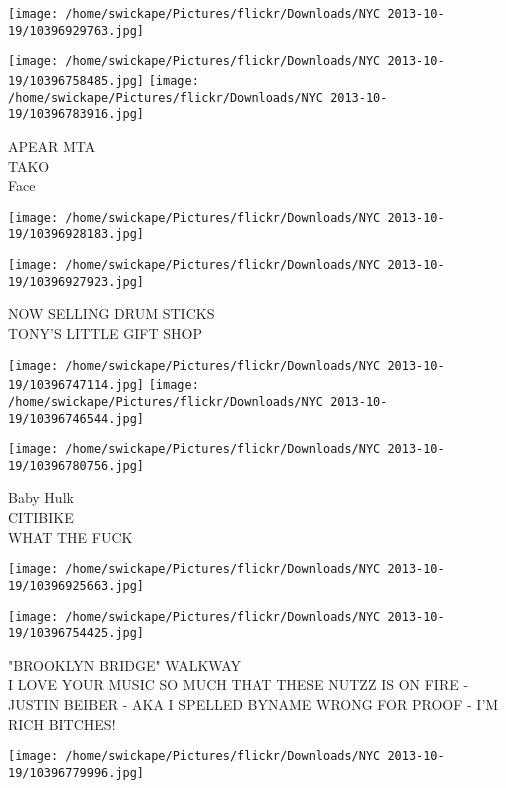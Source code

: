 \documentclass[10pt,letterpaper]{article}
\begin{document}
\texttt{[image: /home/swickape/Pictures/flickr/Downloads/NYC 2013-10-19/10396929763.jpg]}

\vspace{0.25in}
\texttt{[image: /home/swickape/Pictures/flickr/Downloads/NYC 2013-10-19/10396758485.jpg]}
\texttt{[image: /home/swickape/Pictures/flickr/Downloads/NYC 2013-10-19/10396783916.jpg]}

APEAR MTA\\
TAKO\\
Face\\
\pagebreak

\texttt{[image: /home/swickape/Pictures/flickr/Downloads/NYC 2013-10-19/10396928183.jpg]}

\vspace{0.25in}
\texttt{[image: /home/swickape/Pictures/flickr/Downloads/NYC 2013-10-19/10396927923.jpg]}

NOW SELLING DRUM STICKS\\
TONY'S LITTLE GIFT SHOP\\
\pagebreak

\texttt{[image: /home/swickape/Pictures/flickr/Downloads/NYC 2013-10-19/10396747114.jpg]}
\texttt{[image: /home/swickape/Pictures/flickr/Downloads/NYC 2013-10-19/10396746544.jpg]}

\texttt{[image: /home/swickape/Pictures/flickr/Downloads/NYC 2013-10-19/10396780756.jpg]}

Baby Hulk\\
CITIBIKE\\
WHAT THE FUCK\\
\pagebreak

\texttt{[image: /home/swickape/Pictures/flickr/Downloads/NYC 2013-10-19/10396925663.jpg]}

\vspace{0.25in}
\texttt{[image: /home/swickape/Pictures/flickr/Downloads/NYC 2013-10-19/10396754425.jpg]}

"BROOKLYN BRIDGE" WALKWAY\\
I LOVE YOUR MUSIC SO MUCH THAT THESE NUTZZ IS ON FIRE {-} JUSTIN BEIBER {-} AKA I SPELLED BYNAME WRONG FOR PROOF {-} I'M RICH BITCHES!\\
\pagebreak

\texttt{[image: /home/swickape/Pictures/flickr/Downloads/NYC 2013-10-19/10396779996.jpg]}
\end{document}
